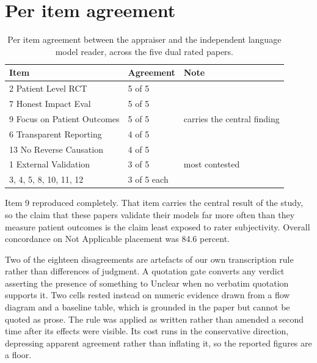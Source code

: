 \documentclass{article}
\begin{document}
\section{Per item agreement}
\label{app:agreement}

\begin{table}[h]
  \caption{Per item agreement between the appraiser and the independent language model reader,
  across the five dual rated papers.}
  \label{tab:itemagree}
  \centering
  \small
  \begin{tabular}{lll}
    \toprule
    Item & Agreement & Note \\
    \midrule
    2 Patient Level RCT          & 5 of 5      & \\
    7 Honest Impact Eval         & 5 of 5      & \\
    9 Focus on Patient Outcomes  & 5 of 5      & carries the central finding \\
    6 Transparent Reporting      & 4 of 5      & \\
    13 No Reverse Causation      & 4 of 5      & \\
    1 External Validation        & 3 of 5      & most contested \\
    3, 4, 5, 8, 10, 11, 12       & 3 of 5 each & \\
    \bottomrule
  \end{tabular}
\end{table}

Item 9 reproduced completely. That item carries the central result of the study, so the claim that
these papers validate their models far more often than they measure patient outcomes is the claim
least exposed to rater subjectivity. Overall concordance on Not Applicable placement was 84.6
percent.

Two of the eighteen disagreements are artefacts of our own transcription rule rather than
differences of judgment. A quotation gate converts any verdict asserting the presence of something
to Unclear when no verbatim quotation supports it. Two cells rested instead on numeric evidence
drawn from a flow diagram and a baseline table, which is grounded in the paper but cannot be quoted
as prose. The rule was applied as written rather than amended a second time after its effects were
visible. Its cost runs in the conservative direction, depressing apparent agreement rather than
inflating it, so the reported figures are a floor.

%
%
\end{document}
